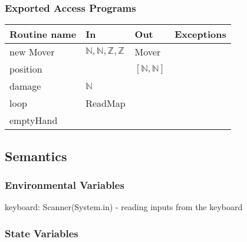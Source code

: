 \documentclass[12pt]{article}
\begin{document}
\subsubsection*{Exported Access Programs}

\begin{tabular}{| l | l | l | l |}
\hline
\textbf{Routine name} & \textbf{In} & \textbf{Out} & \textbf{Exceptions}\\
\hline
new Mover & $\mathbb{N}, \mathbb{N}, \mathbb{Z}, \mathbb{Z}$ & Mover & ~\\
\hline
position & ~ & $[ \mathbb{N}, \mathbb{N} ]$ & ~\\
\hline
damage & $\mathbb{N}$ & ~ & ~\\
\hline
loop & ReadMap & ~ & ~\\
\hline
emptyHand & ~ & ~ & ~\\
\hline
\end{tabular}

\subsection*{Semantics}

\subsubsection*{Environmental Variables}

keyboard: Scanner(System.in) - reading inputs from the keyboard

\subsubsection*{State Variables}
\end{document}
